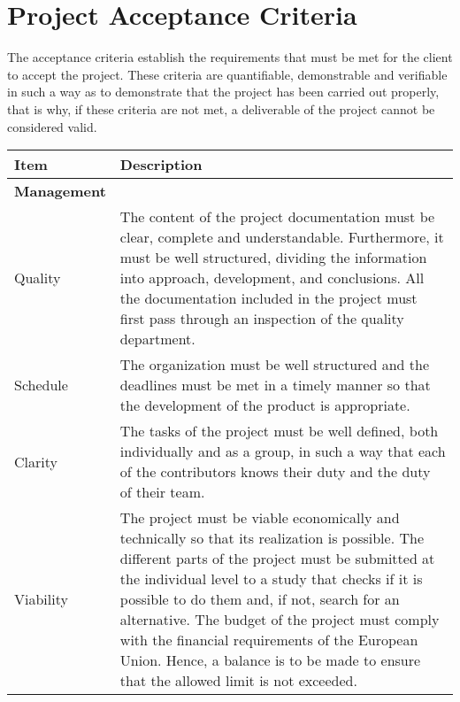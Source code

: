 \section{Project Acceptance Criteria}

The acceptance criteria establish the requirements that must be met for the client to accept the project. These criteria are quantifiable, demonstrable and verifiable in such a way as to demonstrate that the project has been carried out properly, that is why, if these criteria are not met, a deliverable of the project cannot be considered valid.

\begin{longtable}[H]{lp{10.2cm}}
	
	\toprule[2pt]
	
	\textbf{Item} & \textbf{Description} \\
	
	\midrule[1.5pt] 
	\endhead
	
	\textbf{Management} & \vspace{0.2cm} \\

	\midrule[1.5pt]
	
	Quality & The content of the project documentation must be clear, complete and understandable. Furthermore, it must be well structured, dividing the information into approach, development, and conclusions.\vspace{0.2cm}
	\newline
	All the documentation included in the project must first pass through an inspection of the quality department.\vspace{0.2cm} \\

	\midrule	
	
	Schedule & The organization must be well structured and the deadlines must be met in a timely manner so that the development of the product is appropriate.\vspace{0.2cm} \\
	
	\midrule
	
	Clarity & The tasks of the project must be well defined, both individually and as a group, in such a way that each of the contributors knows their duty and the duty of their team.\vspace{0.2cm} \\
	
	\midrule
	
	Viability & The project must be viable economically and technically so that its realization is possible.\vspace{0.2cm}
	\newline
	The different parts of the project must be submitted at the individual level to a study that checks if it is possible to do them and, if not, search for an alternative.\vspace{0.2cm}
	\newline
	The budget of the project must comply with the financial requirements of the European Union. Hence, a balance is to be made to ensure that the allowed limit is not exceeded.\vspace{0.2cm}\\
	

\end{longtable}
